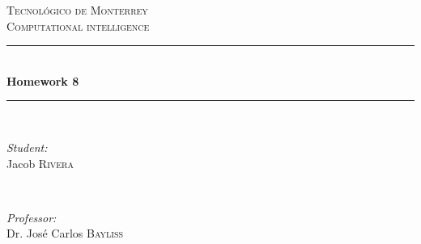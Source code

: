 \documentclass{article}
\begin{document}
\begin{titlepage}

    \newcommand{\HRule}{\rule{\linewidth}{0.5mm}} %

    \center %


    \textsc{\LARGE Tecnológico de Monterrey}\\[1.5cm] %
    \textsc{\Large Computational intelligence}\\[0.5cm] %


    \HRule \\[0.4cm]
    { \huge \bfseries Homework 8}\\[0.4cm] %
    \HRule \\[1.5cm]


    \begin{minipage}{0.4\textwidth}
    \begin{flushleft} \large
    \emph{Student:}\\
    Jacob \textsc{Rivera} %
    \end{flushleft}
    \end{minipage}
    ~
    \begin{minipage}{0.4\textwidth}
    \begin{flushright} \large
    \emph{Professor:} \\
    Dr. José Carlos \textsc{Bayliss} %
    \end{flushright}
    \end{minipage}\\[2cm]


\end{titlepage}
\end{document}
